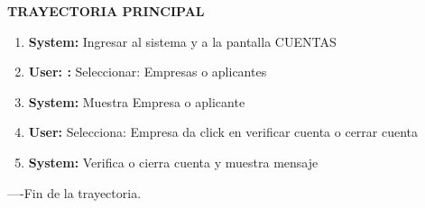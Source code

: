 \textbf{TRAYECTORIA PRINCIPAL}			
\begin{enumerate}			
\item \textbf{	System: 	}	Ingresar al sistema y a la pantalla CUENTAS
\item \textbf{	User: : 	}	Seleccionar:  Empresas o aplicantes
\item \textbf{	System: 	}	Muestra Empresa o aplicante
\item \textbf{	User: 	}	Selecciona: Empresa da click en verificar cuenta o cerrar cuenta
\item \textbf{	System: 	}	Verifica o cierra cuenta y muestra mensaje
			
				
			
\end{enumerate}			
----Fin de la trayectoria.			





